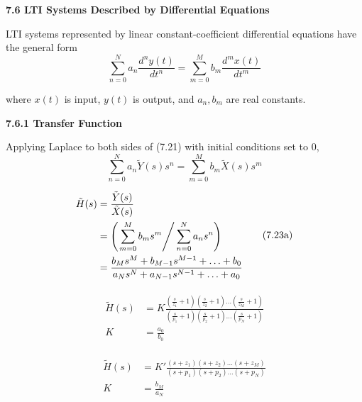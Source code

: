 \documentclass[landscape,a4paper]{extarticle}
\begin{document}
\begin{multicols*}{5}
    \textbf{7.6 LTI Systems Described by Differential Equations}

    LTI systems represented by linear constant-coefficient differential equations have the general form
    \[
        \sum_{n=0}^{N}a_n \frac{d^ny(t)}{dt^n} = \sum_{m=0}^{M} b_m \frac{d^mx(t)}{dt^m} \tag{7.21}
    \]

    where $x(t)$ is input, $y(t)$ is output, and $a_n, b_m$ are real constants.

    \textbf{7.6.1 Transfer Function}

    Applying Laplace to both sides of (7.21) with initial conditions set to 0,
    \[
        \sum_{n=0}^{N}a_n \tilde{Y}(s)s^n = \sum_{m=0}^{M} b_m \tilde{X}(s)s^m \tag{7.22}
    \]

    \begin{align*}
        \begin{split}
            \tilde{H}(s) &= \frac{\tilde{Y}(s)}{\tilde{X}(s)}\\
            &= \left( \left. \sum_{m=0}^{M}b_ms^m \right/ \sum_{n=0}^{N}a_ns^n \right) \\
            &= \frac{b_Ms^M + b_{M-1}s^{M-1} + \ldots + b_0}{a_Ns^N + a_{N-1}s^{N-1} + \ldots + a_0}
        \end{split} \tag{7.23a}
    \end{align*}

    \begin{align*}
        \begin{split}
            \tilde{H}(s) &= K\frac{\left(\frac{s}{z_1} + 1\right)\left(\frac{s}{z_2} + 1\right) \ldots \left(\frac{s}{z_M} + 1\right)}{\left(\frac{s}{p_1} + 1\right)\left(\frac{s}{p_2} + 1\right) \ldots \left(\frac{s}{p_N} + 1\right)}\\
            K &= \frac{a_0}{b_0}
        \end{split} \tag{7.23b}
    \end{align*}

    \begin{align*}
        \begin{split}
            \tilde{H}(s) &= K'\frac{(s+z_1)(s+z_2)\ldots (s+z_M)}{(s+p_1)(s+p_2)\ldots (s+p_N)} \\
            K &=  \frac{b_M}{a_N}
        \end{split} \tag{7.23c}
    \end{align*}


\end{multicols*}
\end{document}
